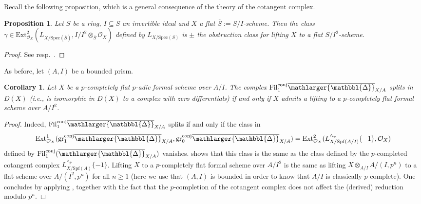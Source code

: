 \documentclass{amsart}
\newcommand{\prism}{{\mathlarger{\mathbbl{\Delta}}}}
\theoremstyle{plain}
\newtheorem{proposition}[theorem]{Proposition}
\newtheorem{corollary}[theorem]{Corollary}
\theoremstyle{definition}
\newcommand{\Spec}{\mathrm{Spec}}
\newcommand{\Spf}{\mathrm{Spf}}
\begin{document}
Recall the following proposition, which is a general consequence of the theory of the cotangent complex.

\begin{proposition}
  \label{sec:prism-cohom-degr-general-lifting-via-cotangent-complex}
  Let $S$ be a ring, $I\subseteq S$ an invertible ideal and $X$ a flat $\overline{S}:=S/I$-scheme. Then the class $\gamma\in \mathrm{Ext}^2_{\mathcal{O}_X}(L_{X/\Spec(\overline{S})},I/I^2\otimes_{\overline{S}}\mathcal{O}_X)$ defined by $L_{X/\Spec(S)}$ is $\pm$ the obstruction class for lifting $X$ to a flat $S/I^2$-scheme. 
\end{proposition}
\begin{proof}
See \cite[III.2.1.2.3]{illusie_complexe_cotangent_et_deformations_I} resp.\ \cite[III.2.1.3.3]{illusie_complexe_cotangent_et_deformations_I}.
\end{proof}

As before, let $(A,I)$ be a bounded prism. 
\begin{corollary}
\label{sec:obstruction-split-same}
Let $X$ be a $p$-completely flat $p$-adic formal scheme over $A/I$. The complex $\mathrm{Fil}_{1}^{\mathrm{conj}}\overline{\prism}_{X/A}$ splits in $D(X)$ (i.e., is isomorphic in $D(X)$ to a complex with zero differentials) if and only if $X$ admits a lifting to a $p$-completely flat formal scheme over $A/I^2$.
\end{corollary}
\begin{proof}
Indeed, $\mathrm{Fil}_{1}^{\mathrm{conj}}\overline{\prism}_{X/A}$ splits if and only if the class in 
\[ \mathrm{Ext}^1_{\mathcal{O}_X}(\mathrm{gr}_{1}^{\mathrm{conj}}\overline{\prism}_{X/A},\mathrm{gr}_{0}^{\mathrm{conj}}\overline{\prism}_{X/A}) = \mathrm{Ext}^2_{\mathcal{O}_X}(L_{X/\Spf(A/I)}^{\wedge_p}\{-1\},\mathcal{O}_X) \]
defined by $\mathrm{Fil}_1^{\rm conj}(\overline{\prism}_{X/A})$ vanishes.  shows that this class is the same as the class defined by the $p$-completed cotangent complex $L_{X/\mathrm{Spf}(A)}^{\wedge_p}\{-1\}$. Lifting $X$ to a $p$-completely flat formal scheme over $A/I^2$ is the same as lifting $X\otimes_{A/I}A/(I,p^n)$ to a flat scheme over $A/(I^2,p^n)$ for all $n\geq 1$ (here we use that $(A,I)$ is bounded in order to know that $A/I$ is classically $p$-complete). One concludes by applying , together with the fact that the $p$-completion of the cotangent complex does not affect the (derived) reduction modulo $p^n$.
\end{proof}
\end{document}
